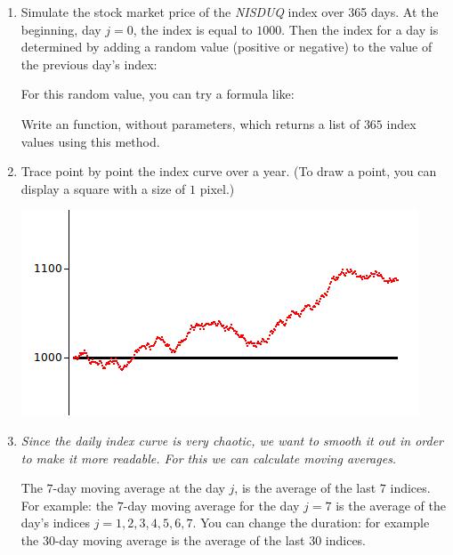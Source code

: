 \documentclass[11pt,class=report,crop=false]{standalone}
\begin{document}
\begin{activite}



\begin{enumerate}
  \item Simulate the stock market price of the \emph{NISDUQ} index over 365 days.
  At the beginning, day $j=0$, the index is equal to $1000$. Then the index for a day is determined by adding a random value (positive or negative) to the value of the previous day's index:  
  
  For this random value, you can try a formula like:  
  
  Write an  function, without parameters, which returns a list of $365$ index values using this method.
  
  \item Trace point by point the index curve over a year. (To draw a point, you can display a square with a size of $1$ pixel.)
  
\begin{center}
\includegraphics[scale=\myscale,scale=0.7]{screen-stat-5a}
\end{center}

   \item \emph{Since the daily index curve is very chaotic, we want to smooth it out in order to make it more readable. For this we can calculate moving averages.}
   
   The $7$-day moving average at the day $j$, is the average of the last $7$ indices. For example: the $7$-day moving average for the day $j = 7$ is the average of the day's indices $j=1,2,3,4,5,6,7$. You can change the duration: for example the $30$-day moving average is the average of the last $30$ indices.
   

\end{enumerate}
\end{activite}
\end{document}
